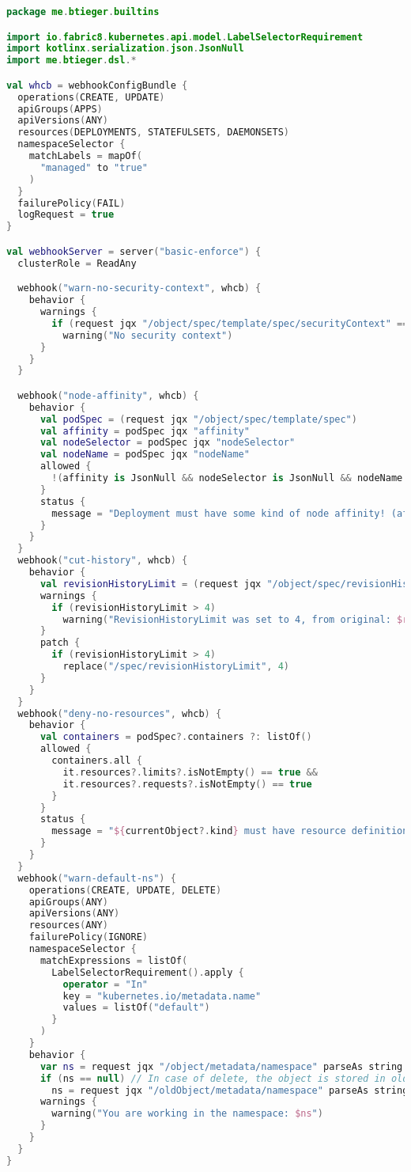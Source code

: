 \clearpage

\begin{lstlisting}[caption={BasicEnforce.kt},language=Kotlin,label=appendix:csr:bekt]
package me.btieger.builtins

import io.fabric8.kubernetes.api.model.LabelSelectorRequirement
import kotlinx.serialization.json.JsonNull
import me.btieger.dsl.*

val whcb = webhookConfigBundle {
  operations(CREATE, UPDATE)
  apiGroups(APPS)
  apiVersions(ANY)
  resources(DEPLOYMENTS, STATEFULSETS, DAEMONSETS)
  namespaceSelector {
    matchLabels = mapOf(
      "managed" to "true"
    )
  }
  failurePolicy(FAIL)
  logRequest = true
}

val webhookServer = server("basic-enforce") {
  clusterRole = ReadAny

  webhook("warn-no-security-context", whcb) {
    behavior {
      warnings {
        if (request jqx "/object/spec/template/spec/securityContext" == JsonEmpty)
          warning("No security context")
      }
    }
  }

  webhook("node-affinity", whcb) {
    behavior {
      val podSpec = (request jqx "/object/spec/template/spec")
      val affinity = podSpec jqx "affinity"
      val nodeSelector = podSpec jqx "nodeSelector"
      val nodeName = podSpec jqx "nodeName"
      allowed {
        !(affinity is JsonNull && nodeSelector is JsonNull && nodeName is JsonNull)
      }
      status {
        message = "Deployment must have some kind of node affinity! (affinity, nodeSelector, nodeName)"
      }
    }
  }
  webhook("cut-history", whcb) {
    behavior {
      val revisionHistoryLimit = (request jqx "/object/spec/revisionHistoryLimit" parseAs int) ?: 10
      warnings {
        if (revisionHistoryLimit > 4) 
          warning("RevisionHistoryLimit was set to 4, from original: $revisionHistoryLimit")
      }
      patch {
        if (revisionHistoryLimit > 4) 
          replace("/spec/revisionHistoryLimit", 4)
      }
    }
  }
  webhook("deny-no-resources", whcb) {
    behavior {
      val containers = podSpec?.containers ?: listOf()
      allowed {
        containers.all {
          it.resources?.limits?.isNotEmpty() == true &&
          it.resources?.requests?.isNotEmpty() == true
        }
      }
      status {
        message = "${currentObject?.kind} must have resource definitions!"
      }
    }
  }
  webhook("warn-default-ns") {
    operations(CREATE, UPDATE, DELETE)
    apiGroups(ANY)
    apiVersions(ANY)
    resources(ANY)
    failurePolicy(IGNORE)
    namespaceSelector {
      matchExpressions = listOf(
        LabelSelectorRequirement().apply {
          operator = "In"
          key = "kubernetes.io/metadata.name"
          values = listOf("default")
        }
      )
    }
    behavior {
      var ns = request jqx "/object/metadata/namespace" parseAs string
      if (ns == null) // In case of delete, the object is stored in oldObject.
        ns = request jqx "/oldObject/metadata/namespace" parseAs string
      warnings {
        warning("You are working in the namespace: $ns")
      }
    }
  }
}
\end{lstlisting}
